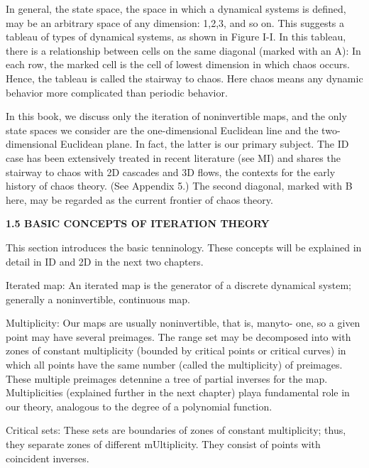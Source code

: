 \documentclass[12pt]{article}
\begin{document}
\hfill

In general, the state space, the space in which a dynamical systems
is defined, may be an arbitrary space of any dimension: 1,2,3,
and so on. This suggests a tableau of types of dynamical systems, as
shown in Figure I-I. In this tableau, there is a relationship between
cells on the same diagonal (marked with an A): In each row, the
marked cell is the cell of lowest dimension in which chaos occurs.
Hence, the tableau is called the stairway to chaos. Here chaos
means any dynamic behavior more complicated than periodic
behavior.

\hfill

In this book, we discuss only the iteration of noninvertible
maps, and the only state spaces we consider are the one-dimensional
Euclidean line and the two-dimensional Euclidean plane. In
fact, the latter is our primary subject. The ID case has been extensively
treated in recent literature (see MI) and shares the stairway
to chaos with 2D cascades and 3D flows, the contexts for the early
history of chaos theory. (See Appendix 5.) The second diagonal,
marked with B here, may be regarded as the current frontier of
chaos theory.

\hfill

\textbf{1.5 BASIC CONCEPTS OF ITERATION THEORY}

\hfill

This section introduces the basic tenninology. These concepts
will be explained in detail in ID and 2D in the next two chapters.

\hfill

Iterated map: An iterated map is the generator of a discrete
dynamical system; generally a noninvertible, continuous map.

\hfill

Multiplicity: Our maps are usually noninvertible, that is, manyto-
one, so a given point may have several preimages. The range set
may be decomposed into with zones of constant multiplicity
(bounded by critical points or critical curves) in which all points
have the same number (called the multiplicity) of preimages. These
multiple preimages detennine a tree of partial inverses for the map.
Multiplicities (explained further in the next chapter) playa fundamental
role in our theory, analogous to the degree of a polynomial
function.

\hfill

Critical sets: These sets are boundaries of zones of constant
multiplicity; thus, they separate zones of different mUltiplicity.
They consist of points with coincident inverses.
\end{document}
